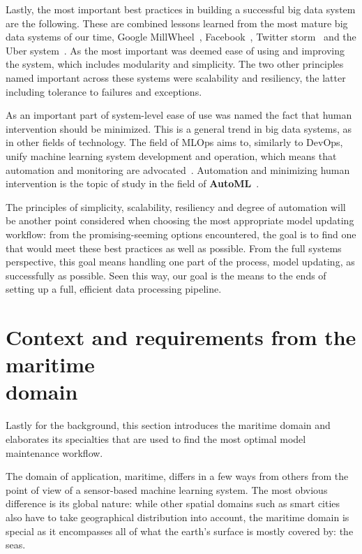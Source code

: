 Lastly, the most important best practices in building a successful big data system are the following. These are combined lessons learned from the most mature big data systems of our time, Google MillWheel~\cite{millwheel}, Facebook~\cite{facebook}, Twitter storm~\cite{storm@twitter} and the Uber system~\cite{uber}. As the most important was deemed ease of using and improving the system, which includes modularity and simplicity. The two other principles named important across these systems were scalability and resiliency, the latter including tolerance to failures and exceptions. 

\enlargethispage{-7mm}
As an important part of system-level ease of use was named the fact that human intervention should be minimized. This is a general trend in big data systems, as in other fields of technology. The field of MLOps aims to, similarly to DevOps, unify machine learning system development and operation, which means that automation and monitoring are advocated~\cite{googlemlops}. Automation and minimizing human intervention is the topic of study in the field of \textbf{AutoML}~\cite{celikAdaptationStrategiesAutomated2021}.


The principles of simplicity, scalability, resiliency and degree of automation will be another point considered when choosing the most appropriate model updating workflow: from the promising-seeming options encountered, the goal is to find one that would meet these best practices as well as possible. From the full systems perspective, this goal means handling one part of the process, model updating, as successfully as possible. Seen this way, our goal is the means to the ends of setting up a full, efficient data processing pipeline.

\section[Context and requirements from the maritime domain]{Context and requirements from the maritime\\ domain}

Lastly for the background, this section introduces the maritime domain and elaborates its specialties that are used to find the most optimal model maintenance workflow.

The domain of application, maritime, differs in a few ways from others from the point of view of a sensor-based machine learning system. The most obvious difference is its global nature: while other spatial domains such as smart cities also have to take geographical distribution into account, the maritime domain is special as it encompasses all of what the earth's surface is mostly covered by: the seas. 

